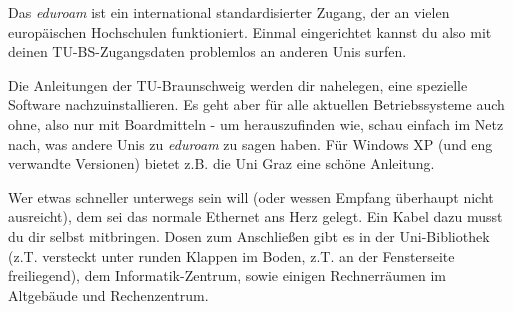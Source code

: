 		Das \emph{eduroam} ist ein international standardisierter Zugang, der an vielen europäischen Hochschulen funktioniert. Einmal eingerichtet kannst du also mit deinen TU-BS-Zugangsdaten problemlos an anderen Unis surfen.

		Die Anleitungen der TU-Braunschweig werden dir nahelegen, eine spezielle Software nachzuinstallieren. Es geht aber für alle aktuellen Betriebssysteme auch ohne, also nur mit Boardmitteln - um herauszufinden wie, schau einfach im Netz nach, was andere Unis zu \emph{eduroam} zu sagen haben. Für Windows XP (und eng verwandte Versionen) bietet z.B. die Uni Graz eine schöne Anleitung.

		Wer etwas schneller unterwegs sein will (oder wessen Empfang überhaupt nicht ausreicht), dem sei das normale Ethernet ans Herz gelegt. Ein Kabel dazu musst du dir selbst mitbringen. Dosen zum Anschließen gibt es in der Uni-Bibliothek (z.T. versteckt unter runden Klappen im Boden, z.T. an der Fensterseite freiliegend), dem Informatik-Zentrum, sowie einigen Rechnerräumen im Altgebäude und Rechenzentrum.
